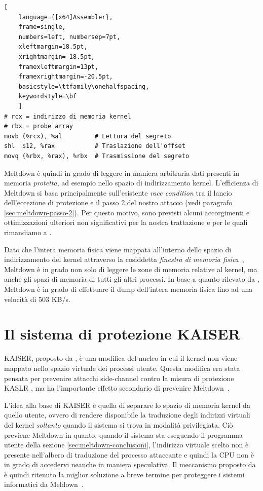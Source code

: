 \begin{lstlisting}[
	language={[x64]Assembler},
	frame=single,
	numbers=left, numbersep=7pt,
	xleftmargin=18.5pt,
	xrightmargin=-18.5pt,
	framexleftmargin=13pt,
	framexrightmargin=-20.5pt,
	basicstyle=\ttfamily\onehalfspacing,
	keywordstyle=\bf
	]
# rcx = indirizzo di memoria kernel
# rbx = probe array
movb (%rcx), %al         # Lettura del segreto
shl  $12, %rax           # Traslazione dell'offset
movq (%rbx, %rax), %rbx  # Trasmissione del segreto
\end{lstlisting} 

Meltdown è quindi in grado di leggere in maniera arbitraria dati presenti in memoria \emph{protetta}, ad esempio nello spazio di indirizzamento kernel. 
L'efficienza di Meltdown si basa principalmente sull'esistente \emph{race condition} tra il lancio dell'eccezione di protezione e il passo 2 del nostro attacco (vedi paragrafo \vref{sec:meltdown-passo-2}). Per questo motivo, sono previsti alcuni accorgimenti e ottimizzazioni ulteriori non significativi per la nostra trattazione e per le quali rimandiamo a \textcite{lipp:meltdown}.

Dato che l'intera memoria fisica viene mappata all'interno dello spazio di indirizzamento del kernel attraverso la cosiddetta \emph{finestra di memoria fisica}~\cite{lettieri:paginazione-complementi}, Meltdown è in grado non solo di leggere le zone di memoria relative al kernel, ma anche gli spazi di memoria di tutti gli altri processi. In base a quanto rilevato da \textcite{lipp:meltdown}, Meltdown è in grado di effettuare il dump dell'intera memoria fisica fino ad una velocità di 503 KB/s.

\section{Il sistema di protezione KAISER}
\label{sec:kaiser}
KAISER, proposto da \textcite{gruss:kaslr}, è una modifica del nucleo in cui il kernel non viene mappato nello spazio virtuale dei processi utente.
Questa modifica era stata pensata per prevenire attacchi side-channel contro la misura di protezione KASLR \cite{hund:practical-timing-side-channel, gruss:prefetch-side-channel-attacks, jang:breaking-kaslr}, ma ha l'importante effetto secondario di prevenire Meltdown~\cite{lipp:meltdown}.

L'idea alla base di KAISER è quella di separare lo spazio di memoria kernel da quello utente, ovvero di rendere disponibile la traduzione degli indirizzi virtuali del kernel \emph{soltanto} quando il sistema si trova in modalità privilegiata.
Ciò previene Meltdown in quanto, quando il sistema sta eseguendo il programma utente della sezione \vref{sec:meltdown-conclusioni}, l'indirizzo virtuale scelto non è presente nell'albero di traduzione del processo attaccante e quindi la CPU non è in grado di accedervi neanche in maniera speculativa.
Il meccanismo proposto da \citeauthor{gruss:kaslr} è quindi ritenuto la miglior soluzione a breve termine per proteggere i sistemi informatici da Meldown~\cite{lipp:meltdown}.


